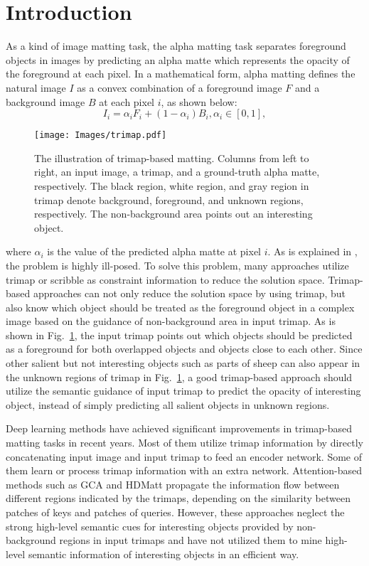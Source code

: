 \documentclass[10pt,twocolumn,letterpaper]{article}
\begin{document}
\section{Introduction}
\label{sec:intro}

As a kind of image matting task, the alpha matting task separates foreground objects in images by predicting an alpha matte which represents the opacity of the foreground at each pixel. In a mathematical form, alpha matting defines the natural image $I$ as a convex
combination of a foreground image $F$ and a background image $B$ at each pixel $i$, as shown below:
\begin{equation}
	I_i ={\alpha}_i F_i + (1-{\alpha}_i) B_i, {\alpha}_i \in [0,1],
	\label{alphaeq}
\end{equation}
\begin{figure}[t]
		\centering
		\texttt{[image: Images/trimap.pdf]}
		\caption{ The illustration of trimap-based matting. Columns from left to right, an input image, a trimap, and a ground-truth alpha matte, respectively. The black region, white region, and gray region in trimap denote background, foreground, and unknown regions, respectively. The non-background area points out an interesting object.}
		\label{trimap}
\end{figure}
where ${\alpha}_i$ is the value of the predicted alpha matte at pixel $i$. As is explained in \cite{gca,adamatting}, the problem is highly ill-posed. To solve this problem, many approaches \cite{bayes_12,iterative} utilize trimap or scribble as constraint information to reduce the solution space. Trimap-based approaches can not only reduce the solution space by using trimap, but also know which object should be treated as the foreground object  in a complex image based on the guidance of non-background area in input trimap. As is shown in Fig.~\ref{trimap}, the input trimap points out which objects should be predicted as a foreground for both overlapped objects and objects close to each other. Since other salient but not interesting objects such as parts of sheep can also appear in the unknown regions of trimap in Fig.~\ref{trimap}, a good trimap-based approach should utilize the semantic guidance of input trimap to predict the opacity of interesting object, instead of simply predicting all salient objects in unknown regions.

Deep learning methods have  achieved significant improvements in trimap-based matting tasks in recent years. Most of them \cite{deepmatting,indexnet,context,fba,pii,lfpnet} utilize trimap information  by directly concatenating input image and input trimap to feed an encoder network. Some of them \cite{adamatting,sim,timinet} learn or process trimap information with  an extra network. Attention-based methods such as GCA \cite{gca} and HDMatt \cite{hdmatt} propagate the information flow between different regions indicated by the trimaps, depending on the similarity between patches of keys and patches of queries. However, these approaches neglect the strong high-level semantic cues for interesting objects provided by non-background regions in input trimaps and have not utilized them to mine high-level semantic information of interesting objects in an efficient way.
\end{document}
